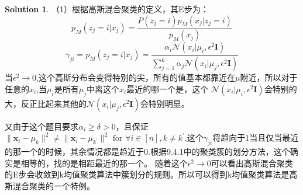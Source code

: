 \documentclass[a4paper,UTF8]{article}
\numberwithin{equation}{section}
\theoremstyle{definition}
\newtheorem*{solution}{Solution}
\def \x {\boldsymbol{x}}
\begin{document}
\begin{solution}
    （1）根据高斯混合聚类的定义，其E步为：\\
    \[  p_M(z_j = i | x_j) = \frac{P(z_j = i) p_M(x_j|z_j = i)}{p_M(x_j)}\]
    \[  \gamma_{ji} =  p_M(z_j = i | x_j) = \frac{\alpha_i \mathcal{N}(x_i | \mu_i, \epsilon^2 \textbf{I})}{\sum_{j=1}^k \alpha_j \mathcal{N}(x_i | \mu_j, \epsilon^2 \textbf{I})}\]
    当$\epsilon^2 \rightarrow 0$,这个高斯分布会变得特别的尖，所有的值基本都靠近在$\mu$附近，所以对于任意的$x_i$,当$\mu_i$是所有$\mu_j$中离这个$x_i$最近的哪一个是，这个
    $\mathcal{N}(x_i | \mu_i, \epsilon^2 \textbf{I})$会特别的大，反正比起来其他的$\mathcal{N}(x_i | \mu_j, \epsilon^2 \textbf{I})$会特别明显。

    又由于这个题目要求$\alpha_i \geq \delta > 0$，且保证$\|\x_i - \mu_k\|^2 \neq \|\x_i - \mu_{k^\prime}\|^2 \text{ for } \forall i \in [n], k \neq k^\prime$,这个$\gamma_{ji}$将趋向于1当且仅当最近的那一个的时候，其余情况都是趋近于0.根据9.4.1中的聚类簇的划分方法，这个确实是相等的，找的是相距最近的那一个。
    随着这个$\epsilon^2\rightarrow 0$可以看出高斯混合聚类的E步会收敛到k均值聚类算法中簇划分的规则。所以可以得到k均值聚类算法是高斯混合聚类的一个特例。


\end{solution}
\end{document}
